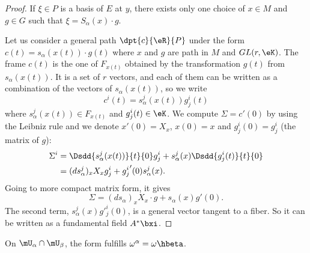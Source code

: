 \begin{proof}
	If $\xi\in P$ is a basis of $E$ at $y$, there exists only one choice of $x\in M$ and $g\in G$ such that $\xi=S_{\alpha}(x)\cdot g$.

	Let us consider a general path $\dpt{c}{\eR}{P}$ under the form $c(t)=s_{\alpha}(x(t))\cdot g(t)$ where $x$ and $g$ are path in $M$ and $GL(r,\eK)$. The frame $c(t)$ is the one of $F_{x(t)}$ obtained by the transformation $g(t)$ from $s_{\alpha}(x(t))$. It is a set of $r$ vectors, and each of them can be written as a combination of the vectors of $s_{\alpha}(x(t))$, so we write
	\begin{equation}
		c^i(t)=s_{\alpha}^j(x(t))g_j^i(t)
	\end{equation}
	where $s_{\alpha}^j(x(t))\in F_{x(t)}$ and $g_j^i(t)\in\eK$. We compute $\Sigma=c'(0)$ by using the Leibniz rule and we denote $x'(0)=X_x$, $x(0)=x$ and $g^i_j(0)=g^i_j$ (the matrix of $g$):
	\begin{equation}
		\begin{split}
			\Sigma^i&=\Dsdd{  s^j_{\alpha}(x(t))  }{t}{0}g^i_j+s^j_{\alpha}(x)\Dsdd{g^i_j(t)}{t}{0}\\
			&=(ds_{\alpha}^j)_xX_xg^i_j+{g^i_j}'(0)s^j_{\alpha}(x).
		\end{split}
	\end{equation}
	Going to more compact matrix form, it gives
	\[
		\Sigma=(ds_{\alpha})_xX_x\cdot g+s_{\alpha}(x)g'(0).
	\]
	The second term, $s_{\alpha}^j(x)g'^i_j(0)$, is a general vector tangent to a fiber. So it can be written as a fundamental field $A^*\bxi$.

\end{proof}

\begin{lemma}
	On $\mU_{\alpha}\cap\mU_{\beta}$, the form fulfills $\omega^{\alpha}=\omega\hbeta$.
\end{lemma}

